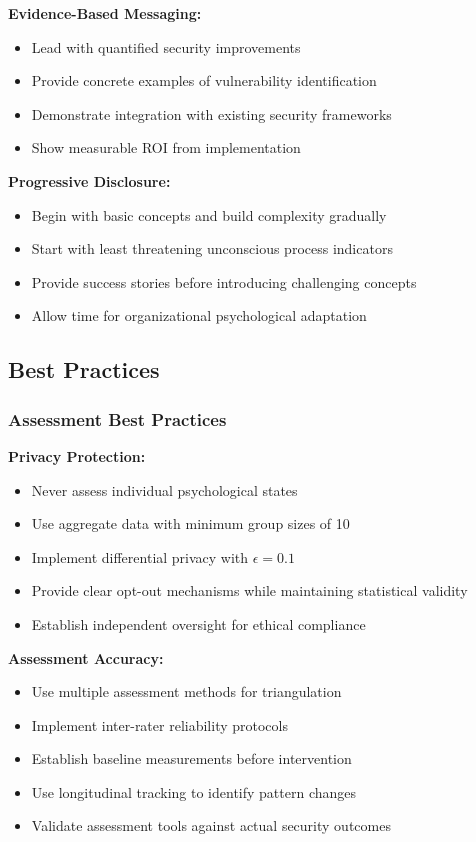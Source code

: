 \documentclass[11pt,a4paper]{article}
\begin{document}
\textbf{Evidence-Based Messaging:}
\begin{itemize}
\item Lead with quantified security improvements
\item Provide concrete examples of vulnerability identification
\item Demonstrate integration with existing security frameworks
\item Show measurable ROI from implementation
\end{itemize}

\textbf{Progressive Disclosure:}
\begin{itemize}
\item Begin with basic concepts and build complexity gradually
\item Start with least threatening unconscious process indicators
\item Provide success stories before introducing challenging concepts
\item Allow time for organizational psychological adaptation
\end{itemize}

\subsection{Best Practices}

\subsubsection{Assessment Best Practices}

\textbf{Privacy Protection:}
\begin{itemize}
\item Never assess individual psychological states
\item Use aggregate data with minimum group sizes of 10
\item Implement differential privacy with $\epsilon = 0.1$
\item Provide clear opt-out mechanisms while maintaining statistical validity
\item Establish independent oversight for ethical compliance
\end{itemize}

\textbf{Assessment Accuracy:}
\begin{itemize}
\item Use multiple assessment methods for triangulation
\item Implement inter-rater reliability protocols
\item Establish baseline measurements before intervention
\item Use longitudinal tracking to identify pattern changes
\item Validate assessment tools against actual security outcomes
\end{itemize}
\end{document}
